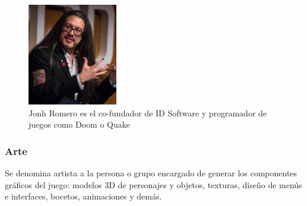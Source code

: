\begin{figure}[h]
    \centering
    \includegraphics[width=0.35\textwidth]{images/estadodelarte/desarrollo/john-romero}
    \caption{Jonh Romero es el co-fundador de ID Software y programador de juegos como Doom o Quake}
\end{figure}

\subsubsection{Arte}
Se denomina artista a la persona o grupo encargado de generar los componentes gráficos del juego: modelos 3D de personajes y objetos, texturas, diseño de menús e interfaces, bocetos, animaciones y demás.

